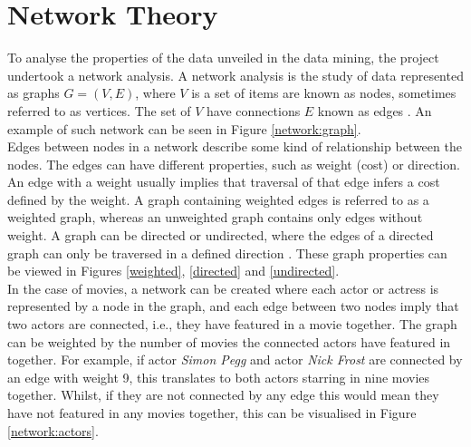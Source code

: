 \documentclass[12pt]{ieeeconf}      %
\begin{document}
\section{Network Theory}
\label{network_theory}
\indent To analyse the properties of the data unveiled in the data mining, the project undertook a network analysis. A network analysis is the study of data represented as graphs $G = (V,E)$, where $V$ is a set of items are known as nodes, sometimes referred to as vertices. The set of $V$ have connections $E$ known as edges \cite{network:structure}. An example of such network can be seen in Figure \ref{network:graph}.
\\
\indent Edges between nodes in a network describe some kind of relationship between the nodes. The edges can have different properties, such as weight (cost) or direction. An edge with a weight usually implies that traversal of that edge infers a cost defined by the weight. A graph containing weighted edges is referred to as a weighted graph, whereas an unweighted graph contains only edges without weight. A graph can be directed or undirected, where the edges of a directed graph can only be traversed in a defined direction \cite{network:structure}. These graph properties can be viewed in Figures \ref{weighted}, \ref{directed} and \ref{undirected}.
\\
\indent In the case of movies, a network can be created where each actor or actress is represented by a node in the graph, and each edge between two nodes imply that two actors are connected, i.e., they have featured in a movie together. The graph can be weighted by the number of movies the connected actors have featured in together. For example, if actor \textit{Simon Pegg} and actor \textit{Nick Frost} are connected by an edge with weight 9, this translates to both actors starring in nine movies together. Whilst, if they are not connected by any edge this would mean they have not featured in any movies together, this can be visualised in Figure \ref{network:actors}.
\end{document}
